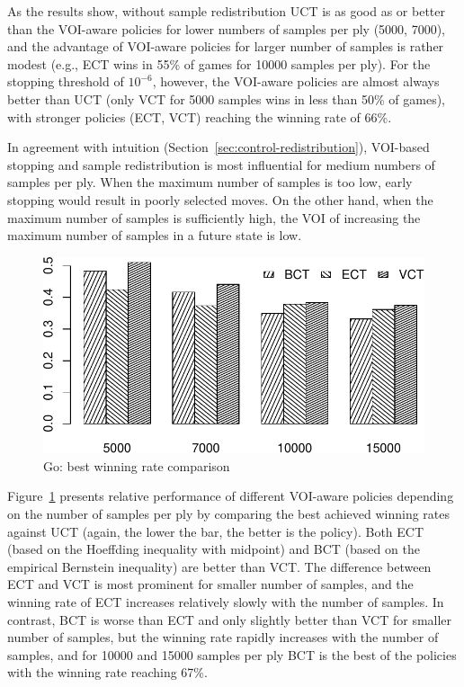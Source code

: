 \documentclass{article}
\begin{document}
As the results show, without sample redistribution UCT is as good as or
better than the VOI-aware policies for lower numbers of samples per ply
(5000, 7000), and the advantage of VOI-aware policies for larger
number of samples is rather modest (e.g., ECT wins in 55\% of games for
10000 samples per ply). For the stopping threshold of $10^{-6}$,
however, the VOI-aware policies are almost always better than UCT
(only VCT for 5000 samples wins in less than 50\% of games), with
stronger policies (ECT, VCT) reaching the winning rate of 66\%.

In agreement with intuition
(Section~\ref{sec:control-redistribution}), VOI-based stopping and sample
redistribution is most influential for medium numbers of samples per
ply. When the maximum number of samples is too low, early stopping would
result in poorly selected moves. On the other hand, when the maximum
number of samples is sufficiently high, the VOI of increasing the
maximum number of samples in a future state is low.

\begin{figure}[h]
\centering
\includegraphics[scale=0.8]{bests-bw.pdf}
\caption{Go: best winning rate comparison}
\label{fig:best-winning-rate}
\end{figure}
Figure~\ref{fig:best-winning-rate} presents relative performance of
different VOI-aware policies depending on the number of samples per
ply by comparing the best achieved winning rates against UCT (again,
the lower the bar, the better is the policy). Both ECT (based on the
Hoeffding inequality with midpoint) and BCT (based on the empirical
Bernstein inequality) are better than VCT. The difference between ECT
and VCT is most prominent for smaller number of samples, and the
winning rate of ECT increases relatively slowly with the number of
samples. In contrast, BCT is worse than ECT and only slightly better
than VCT for smaller number of samples, but the winning rate rapidly
increases with the number of samples, and for 10000 and 15000 samples
per ply BCT is the best of the policies with the winning rate reaching
67\%.
\end{document}
